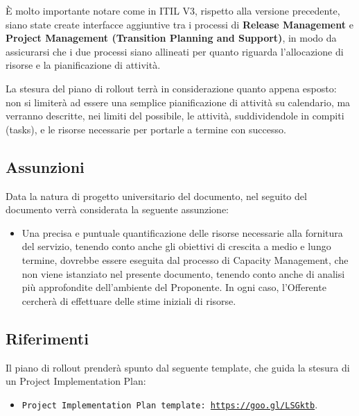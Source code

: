 			È molto importante notare come in ITIL V3, rispetto alla versione precedente, siano state create interfacce aggiuntive tra i processi di \textbf{Release Management} e \textbf{Project Management (Transition Planning and Support)}, in modo da assicurarsi che i due processi siano allineati per quanto riguarda l'allocazione di risorse e la pianificazione di attività.
            
            
            La stesura del piano di rollout terrà in considerazione quanto appena esposto: non si limiterà ad essere una semplice pianificazione di attività su calendario, ma verranno descritte, nei limiti del possibile, le attività, suddividendole in compiti (tasks), e le risorse necessarie per portarle a termine con successo.
            
            \subsection{Assunzioni}
            	Data la natura di progetto universitario del documento, nel seguito del documento verrà considerata la seguente assunzione:
                \begin{itemize}
                	\item Una precisa e puntuale quantificazione delle risorse necessarie alla fornitura del servizio, tenendo conto anche gli obiettivi di crescita a medio e lungo termine, dovrebbe essere eseguita dal processo di Capacity Management, che non viene istanziato nel presente documento, tenendo conto anche di analisi più approfondite dell'ambiente del Proponente. In ogni caso, l'Offerente cercherà di effettuare delle stime iniziali di risorse. 
                \end{itemize}
                
                
		\subsection{Riferimenti}
        	Il piano di rollout prenderà spunto dal seguente template, che guida la stesura di un Project Implementation Plan:
            \begin{itemize}
            	\item \texttt{Project Implementation Plan template: \url{https://goo.gl/LSGktb}}. 
            \end{itemize}
            
